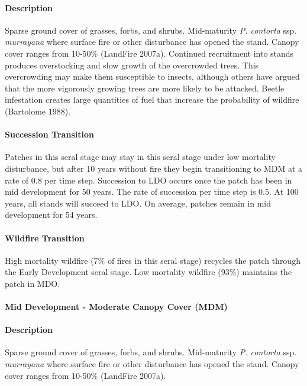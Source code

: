 \paragraph{Description} Sparse ground cover of grasses, forbs, and shrubs. Mid-maturity \emph{P. contorta} ssp. \emph{murrayana} where surface fire or other disturbance has opened the stand. Canopy cover ranges from 10-50\% (LandFire 2007a).
Continued recruitment into stands produces overstocking and slow growth of the overcrowded trees. This overcrowding may make them susceptible to insects, although others have argued that the more vigorously growing trees are more likely to be attacked. Beetle infestation creates large quantities of fuel that increase the probability of wildfire (Bartolome 1988).


\paragraph{Succession Transition} Patches in this seral stage may stay in this seral stage under low mortality disturbance, but after 10 years without fire they begin transitioning to MDM at a rate of 0.8 per time step. Succession to LDO occurs once the patch has been in mid development for 50 years. The rate of succession per time step is 0.5. At 100 years, all stands will succeed to LDO. On average, patches remain in mid development for 54 years.

\paragraph{Wildfire Transition} High mortality wildfire (7\% of fires in this seral stage) recycles the patch through the Early Development seral stage. Low mortality wildfire (93\%) maintains the patch in MDO.

\noindent\hrulefill

\paragraph{Mid Development - Moderate Canopy Cover (MDM)}

\paragraph{Description} Sparse ground cover of grasses, forbs, and shrubs. Mid-maturity \emph{P. contorta} ssp. \emph{murrayana} where surface fire or other disturbance has opened the stand. Canopy cover ranges from 10-50\% (LandFire 2007a).

